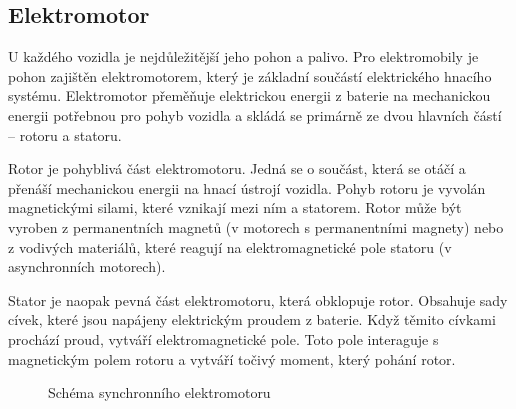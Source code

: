 \documentclass[a4paper,11pt]{article}
\begin{document}
\subsection{Elektromotor}
U každého vozidla je nejdůležitější jeho pohon a palivo. Pro elektromobily je pohon zajištěn 
elektromotorem, který je základní součástí elektrického hnacího systému. Elektromotor přeměňuje 
elektrickou energii z baterie na mechanickou energii potřebnou pro pohyb vozidla a skládá se 
primárně ze dvou hlavních částí -- rotoru a statoru. \cite{typy_elektromotoru}

Rotor je pohyblivá část elektromotoru. Jedná se o součást, která se otáčí a přenáší mechanickou 
energii na hnací ústrojí vozidla. Pohyb rotoru je vyvolán magnetickými silami, které vznikají mezi 
ním a statorem. Rotor může být vyroben z permanentních magnetů (v motorech s permanentními magnety) 
nebo z vodivých materiálů, které reagují na elektromagnetické pole statoru (v asynchronních motorech). \cite{elektromotor}

Stator je naopak pevná část elektromotoru, která obklopuje rotor. Obsahuje sady cívek, které jsou 
napájeny elektrickým proudem z baterie. Když těmito cívkami prochází proud, vytváří elektromagnetické 
pole. Toto pole interaguje s magnetickým polem rotoru a vytváří točivý moment, který pohání rotor. \cite{elektromotor}

\begin{figure}[H]
    \centering
    \caption{Schéma synchronního elektromotoru \cite{elektromotor}}
    \label{figure:synchroni-elektromotor}
\end{figure}
\end{document}
